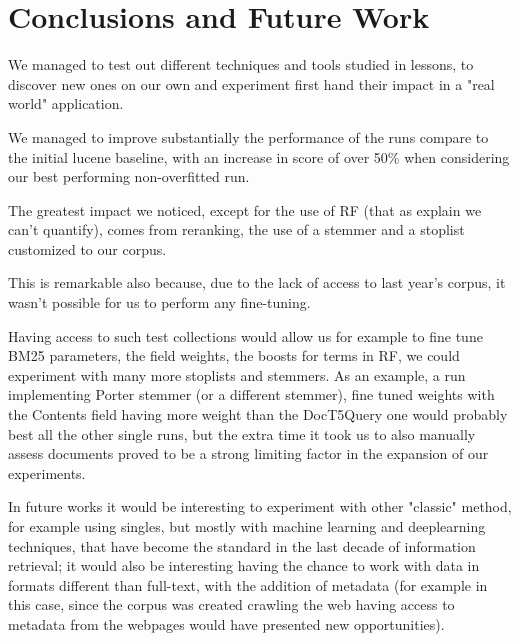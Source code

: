 \section{Conclusions and Future Work}
\label{sec:conclusion}

We managed to test out different techniques and tools studied in lessons, to discover new ones on our own and experiment first hand their impact in a "real world" application.

We managed to improve substantially the performance of the runs compare to the initial lucene baseline, with an increase in score of over 50\% when considering our best performing non-overfitted run.

The greatest impact we noticed, except for the use of RF (that as explain we can't quantify), comes from reranking, the use of a stemmer and a stoplist customized to our corpus.

This is remarkable also because, due to the lack of access to last year's corpus, it wasn't possible for us to perform any fine-tuning.

Having access to such test collections would allow us for example to fine tune BM25 parameters, the field weights, the boosts for terms in RF, we could experiment with many more stoplists and stemmers.
As an example, a run implementing Porter stemmer (or a different stemmer), fine tuned weights with the Contents field having more weight than the DocT5Query one would probably best all the other single runs, but the extra time it took us to also manually assess documents proved to be a strong limiting factor in the expansion of our experiments.

In future works it would be interesting to experiment with other "classic" method, for example using singles, but mostly with machine learning and deeplearning techniques, that have become the standard in the last decade of information retrieval; it would also be interesting having the chance to work with data in formats different than full-text, with the addition of metadata (for example in this case, since the corpus was created crawling the web having access to metadata from the webpages would have presented new opportunities).
